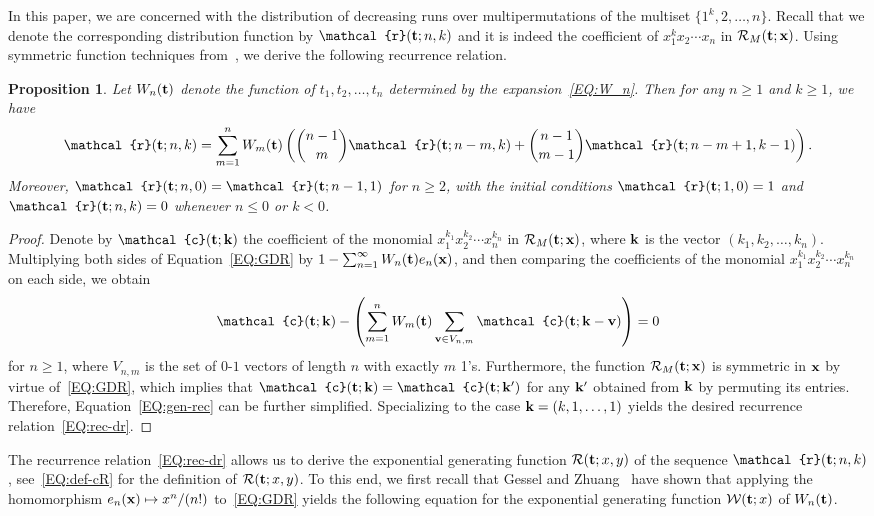 \documentclass[11pt]{article}
\newcommand{\vt} { {\bf t}}
\newcommand{\vk} { {\bf k}}
\newcommand{\vv} { {\bf v}}
\newcommand{\vx} { {\bf x}}
\numberwithin{equation}{section}
\newtheorem{prop}[thm]{Proposition}
\def\cR{\mathcal{R}}
\def\cW{\mathcal{W}}
\newcommand{\ccr}{\mathcal{r}}
\newcommand{\cc}{\mathcal{c}}
\begin{document}
In this paper, we are concerned with the distribution of decreasing runs over multipermutations of the multiset $\{1^k,2,\ldots,n\}$. Recall that we denote the corresponding distribution function by $\ccr(\vt;n,k)$ and it is indeed the coefficient of $x_1^k x_2 \cdots x_n$ in $\cR_M(\vt;\vx)$. Using symmetric function techniques from~\cite{Yang2020}, we derive the following recurrence relation.

\begin{prop}\label{PROP:rec-dr}
	Let $W_n(\vt)$ denote the function of $t_1,t_2,\ldots,t_n$ determined by the expansion~\eqref{EQ:W_n}. Then for any $n\geq1$ and $k\geq1$, we have
	\begin{align}\label{EQ:rec-dr}
	\ccr(\vt;n,k)=\sum_{m=1}^{n}W_m(\vt)\left(\binom{n-1}{m}\ccr(\vt;n-m,k)+\binom{n-1}{m-1}\ccr(\vt;n-m+1,k-1)\right).
	\end{align}
	Moreover, $\ccr(\vt;n,0)=\ccr(\vt;n-1,1)$ for $n\geq2$, with the initial conditions $\ccr(\vt;1,0)=1$ and $\ccr(\vt;n,k)=0$ whenever $n\leq 0$ or $k< 0$.
\end{prop}
\begin{proof}
	Denote by $\cc(\vt;\vk)$ the coefficient of the monomial $x_1^{k_1}x_2^{k_2}\cdots x_n^{k_n}$ in $\cR_M(\vt;\vx)$, where $\vk$ is the vector $(k_1,k_2,\ldots,k_n)$. Multiplying both sides of Equation~\eqref{EQ:GDR} by $ 1 -\sum_{n=1}^{\infty} W_n(\vt) e_n(\vx) $, and then comparing the coefficients of the monomial $x_1^{k_1}x_2^{k_2}\cdots x_n^{k_n}$ on each side, we obtain 
	\begin{align}\label{EQ:gen-rec}
	\cc(\vt;\vk)-\left(\sum_{m=1}^{n}W_m(\vt)\sum_{\vv\in V_{n,m}}\cc(\vt;\vk-\vv)\right)=0
	\end{align}
	for $n\geq1$, where $V_{n,m}$ is the set of $0$-$1$ vectors of length $n$ with exactly $m$ 1's. Furthermore, the function $\cR_M(\vt;\vx)$ is symmetric in $\vx$ by virtue of~\eqref{EQ:GDR}, which implies that $\cc(\vt;\vk)=\cc(\vt;\vk')$ for any $\vk'$ obtained from $\vk$ by permuting its entries. Therefore, Equation~\eqref{EQ:gen-rec} can be further simplified. Specializing to the case $\vk=(k,1,\ldots,1)$ yields the desired recurrence relation~\eqref{EQ:rec-dr}.
\end{proof}

The recurrence relation~\eqref{EQ:rec-dr} allows us to derive the exponential generating function $\cR(\vt;x,y)$ of the sequence $\ccr(\vt;n,k)$, see~\eqref{EQ:def-cR} for the definition of $\cR(\vt;x,y)$. 
To this end, we first recall that Gessel and Zhuang~\cite{GesselZhuang2014} have shown that applying the homomorphism $e_n(\vx)\mapsto x^n/(n!)$ to~\eqref{EQ:GDR} yields the following equation for the exponential generating function $\cW(\vt;x)$ of $W_n(\vt)$.
\end{document}
